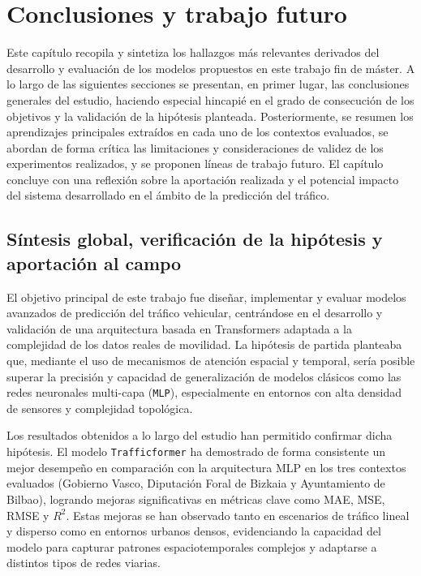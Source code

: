 \section{Conclusiones y trabajo futuro}
\label{sec:conclusiones}

Este capítulo recopila y sintetiza los hallazgos más relevantes derivados del desarrollo y evaluación de los modelos propuestos en este trabajo fin de máster. A lo largo de las siguientes secciones se presentan, en primer lugar, las conclusiones generales del estudio, haciendo especial hincapié en el grado de consecución de los objetivos y la validación de la hipótesis planteada. Posteriormente, se resumen los aprendizajes principales extraídos en cada uno de los contextos evaluados, se abordan de forma crítica las limitaciones y consideraciones de validez de los experimentos realizados, y se proponen líneas de trabajo futuro. El capítulo concluye con una reflexión sobre la aportación realizada y el potencial impacto del sistema desarrollado en el ámbito de la predicción del tráfico.

\subsection{Síntesis global, verificación de la hipótesis y aportación al campo}
\label{sec:sintesis_verif}

El objetivo principal de este trabajo fue diseñar, implementar y evaluar modelos avanzados de predicción del tráfico vehicular, centrándose en el desarrollo y validación de una arquitectura basada en Transformers adaptada a la complejidad de los datos reales de movilidad. La hipótesis de partida planteaba que, mediante el uso de mecanismos de atención espacial y temporal, sería posible superar la precisión y capacidad de generalización de modelos clásicos como las redes neuronales multi-capa (\texttt{MLP}), especialmente en entornos con alta densidad de sensores y complejidad topológica.

Los resultados obtenidos a lo largo del estudio han permitido confirmar dicha hipótesis. El modelo \texttt{Trafficformer} ha demostrado de forma consistente un mejor desempeño en comparación con la arquitectura MLP en los tres contextos evaluados (Gobierno Vasco, Diputación Foral de Bizkaia y Ayuntamiento de Bilbao), logrando mejoras significativas en métricas clave como MAE, MSE, RMSE y $R^2$. Estas mejoras se han observado tanto en escenarios de tráfico lineal y disperso como en entornos urbanos densos, evidenciando la capacidad del modelo para capturar patrones espaciotemporales complejos y adaptarse a distintos tipos de redes viarias.


